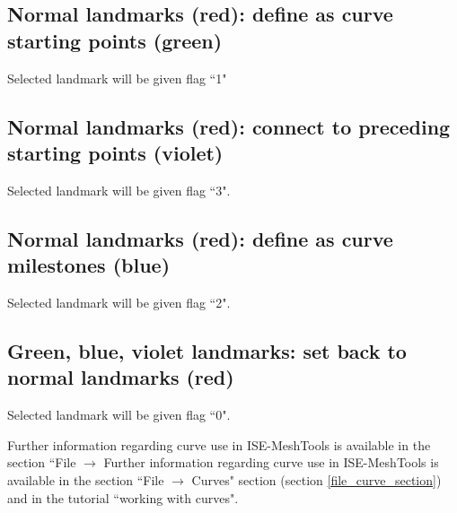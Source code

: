 \subsection{Normal landmarks (red): define as curve starting points (green)}
Selected landmark will be given flag ``1"


\subsection{Normal landmarks (red): connect to preceding starting points (violet)}
Selected landmark will be given flag ``3".


\subsection{Normal landmarks (red): define as curve milestones (blue)}
Selected landmark will be given flag ``2".

\subsection{Green, blue, violet landmarks: set back to normal landmarks (red)}
Selected landmark will be given flag ``0".

\noindent Further information regarding curve use in ISE-MeshTools is available in the section ``File $\rightarrow$
\noindent Further information regarding curve use in ISE-MeshTools is available in the section ``File $\rightarrow$
Curves" section (section \ref{file_curve_section}) and in the tutorial ``working with curves".